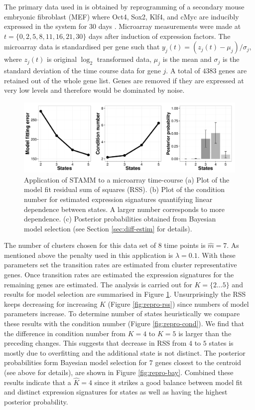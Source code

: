 The primary data used in \cite{Armond:2013} is obtained by reprogramming of a secondary mouse embryonic fibroblast (MEF) where Oct4, Sox2, Klf4, and cMyc are inducibly expressed in the system for 30 days \citep{SamavarchiTehrani:2010cp}. Microarray measurements were made at $t = \lbrace 0, 2, 5, 8, 11, 16, 21, 30 \rbrace$ days after induction of expression factors. The microarray data is standardised per gene such that $y_j(t) = \left(z_j(t) - \mu_j \right) / \sigma_j$, where $z_j(t)$ is original $\log_2$ transformed data, $\mu_j$ is the mean and $\sigma_j$ is the standard deviation of the time course data for gene $j$. A total of $4383$ genes are retained out of the whole gene list. Genes are removed if they are expressed at very low levels and therefore would be dominated by noise. 

\begin{figure}[!t]
  \centering
  \includegraphics[width=1\textwidth]{pics/rss_rcond_bay1.pdf}
  \caption{Application of STAMM to a microarray time-course (a) Plot of the model fit residual sum of squares (RSS). (b) Plot of the condition number for estimated expression signatures quantifying linear dependence between states. A larger number corresponds to more dependence. (c) Posterior probabilities obtained from Bayesian model selection (see Section \ref{sec:diff-estim} for details).}
  \label{fig:model-fit-repro}
\end{figure}

The number of clusters chosen for this data set of $8$ time points is $\hat{m} = 7$. As mentioned above the penalty used in this application is $\lambda = 0.1$. With these parameters set the transition rates are estimated from cluster representative genes. Once transition rates are estimated the expression signatures for the remaining genes are estimated. The analysis is carried out for $K = \lbrace 2 \ldots 5 \rbrace $ and results for model selection are summarised in Figure \ref{fig:model-fit-repro}. Unsurprisingly the RSS keeps decreasing for increasing $K$ (Figure \ref{fig:repro-rss}) since numbers of model parameters increase. To determine number of states heuristically we compare these results with the condition number (Figure \ref{fig:repro-cond}). We find that the difference in condition number from $K=4$ to $K=5$ is larger than the preceding changes. This suggests that decrease in RSS from $4$ to $5$ states is mostly due to overfitting and the additional state is not distinct. The posterior probabilities form Bayesian model selection for $7$  genes closest to the centroid (see above for details), are shown in Figure \ref{fig:repro-bay}. Combined these results indicate that a $\hat{K} = 4$ since it strikes a good balance between model fit and distinct expression signatures for states as well as having the highest posterior probability. 

